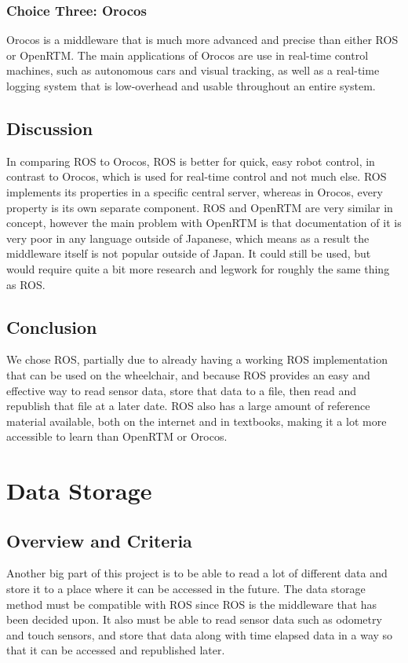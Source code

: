 \documentclass[onecolumn, draftclsnofoot,10pt, compsoc]{IEEEtran}
\begin{document}
\subsubsection{Choice Three: Orocos}
Orocos is a middleware that is much more advanced and precise than either ROS or OpenRTM. The main applications of Orocos are use in real-time control machines, such as autonomous cars and visual tracking, as well as a real-time logging system that is low-overhead and usable throughout an entire system.\cite{Orocos_Roadmap}

\subsection{Discussion}
In comparing ROS to Orocos, ROS is better for quick, easy robot control, in contrast to Orocos, which is used for real-time control and not much else. ROS implements its properties in a specific central server, whereas in Orocos, every property is its own separate component.\cite{Orocos_And_ROS} ROS and OpenRTM are very similar in concept, however the main problem with OpenRTM is that documentation of it is very poor in any language outside of Japanese, which means as a result the middleware itself is not popular outside of Japan. It could still be used, but would require quite a bit more research and legwork for roughly the same thing as ROS.\cite{Robot_Middleware}

\subsection{Conclusion}
We chose ROS, partially due to already having a working ROS implementation that can be used on the wheelchair, and because ROS provides an easy and effective way to read sensor data, store that data to a file, then read and republish that file at a later date. ROS also has a large amount of reference material available, both on the internet and in textbooks, making it a lot more accessible to learn than OpenRTM or Orocos.

\section{Data Storage}
\subsection{Overview and Criteria}
Another big part of this project is to be able to read a lot of different data and store it to a place where it can be accessed in the future. The data storage method must be compatible with ROS since ROS is the middleware that has been decided upon. It also must be able to read sensor data such as odometry and touch sensors, and store that data along with time elapsed data in a way so that it can be accessed and republished later.
\end{document}
